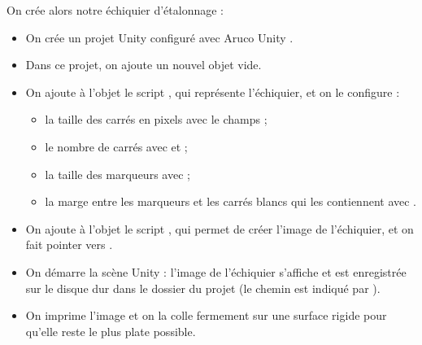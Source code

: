 On crée alors notre échiquier d'étalonnage  :
\begin{itemize}
  \item On crée un projet Unity configuré avec Aruco Unity .
  \item Dans ce projet, on ajoute un nouvel objet vide.
  \item On ajoute à l'objet le script , qui représente l'échiquier, et on le configure :
  \begin{itemize}
    \item la taille des carrés en pixels avec le champs  ;
    \item le nombre de carrés avec  et  ;
    \item la taille des marqueurs avec  ;
    \item la marge entre les marqueurs et les carrés blancs qui les contiennent avec .
  \end{itemize}
  \item On ajoute à l'objet le script , qui permet de créer l'image de l'échiquier, et on fait pointer  vers .
  \item On démarre la scène Unity : l'image de l'échiquier s'affiche et est enregistrée sur le disque dur dans le dossier du projet (le chemin est indiqué par ).
  \item On imprime l'image et on la colle fermement sur une surface rigide pour qu'elle reste le plus plate possible.
\end{itemize}  


